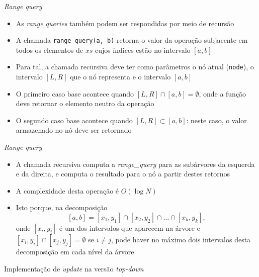 \begin{frame}[fragile]{\it Range query}

    \begin{itemize}
        \item As \textit{range queries} também podem ser respondidas por meio de recursão

        \item A chamada \texttt{range\_query(a, b)} retorna o valor da operação subjacente em todos
            os elementos de $xs$ cujos índices estão no intervalo $[a, b]$

        \item Para tal, a chamada recursiva deve ter como parâmetros o nó atual (\texttt{node}),
            o intervalo $[L, R]$ que o nó representa e o intervalo $[a, b]$

        \item O primeiro caso base acontece quando $[L, R]\cap [a, b] = \emptyset$, onde a
            função deve retornar o elemento neutro da operação

        \item O segundo caso base acontece quando $[L, R]\subset [a, b]$: neste caso, o valor
            armazenado no nó deve ser retornado

    \end{itemize}

\end{frame}

\begin{frame}[fragile]{\it Range query}

    \begin{itemize}
        \item A chamada recursiva computa a \textit{range\_query} para as subárvores da esquerda
            e da direita, e computa o resultado para o nó a partir destes retornos

        \item A complexidade desta operação é $O(\log N)$

        \item Isto porque, na decomposição 
            \[
                [a, b] = [x_1, y_1]\cap [x_2, y_2]\cap \ldots \cap [x_k, y_k],
            \] 
            onde $[x_i, y_i]$ é um dos intervalos que aparecem na árvore e $[x_i, y_i]\cap
                [x_j, y_j] = \emptyset$ se $i\neq j$, pode haver no máximo dois intervalos
                desta decomposição em cada nível da árvore
    \end{itemize}

\end{frame}



\begin{frame}[fragile]{Implementação de {\it update} na versão {\it top-down}}
\end{frame}
